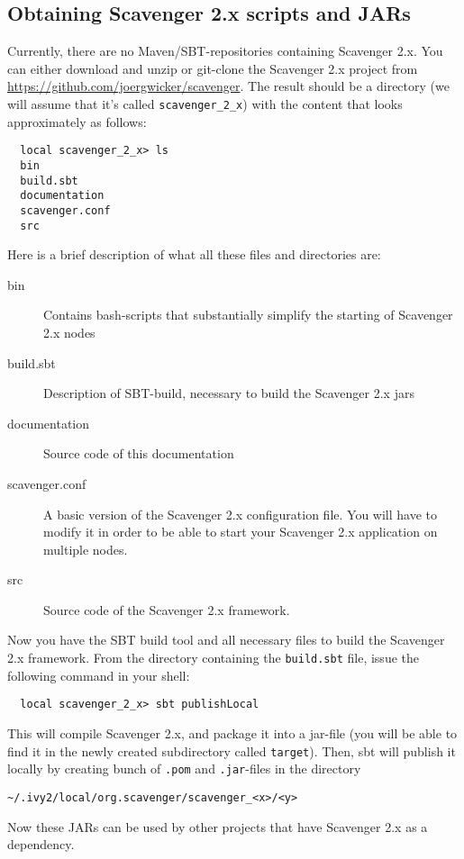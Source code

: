 \documentclass{scrbook}
\begin{document}
\subsection{Obtaining Scavenger 2.x scripts and JARs}
Currently, there are no Maven/SBT-repositories containing Scavenger 2.x.
You can either download and unzip or git-clone the Scavenger 2.x project from 
\url{https://github.com/joergwicker/scavenger}.
The result should be a directory (we will assume that it's called \lstinline{scavenger_2_x}) with the content that 
looks approximately as follows:
\begin{lstlisting}
  local scavenger_2_x> ls
  bin
  build.sbt
  documentation
  scavenger.conf
  src
\end{lstlisting}
Here is a brief description of what all these files and directories are:
\begin{description}
  \item[bin] Contains bash-scripts that substantially simplify the
    starting of Scavenger 2.x nodes
  \item[build.sbt] Description of SBT-build, necessary to build the 
    Scavenger 2.x jars
  \item[documentation] Source code of this documentation
  \item[scavenger.conf] A basic version of the Scavenger 2.x configuration
    file. You will have to modify it in order to be able to start your
    Scavenger 2.x application on multiple nodes.
  \item[src] Source code of the Scavenger 2.x framework.
\end{description}

Now you have the SBT build tool and all necessary files to build 
the Scavenger 2.x framework. From the directory containing the
\lstinline{build.sbt} file, issue the following command in your shell:
\begin{lstlisting}
  local scavenger_2_x> sbt publishLocal
\end{lstlisting}
This will compile Scavenger 2.x, and package it into a jar-file 
(you will be able to find it in the newly created subdirectory
called \lstinline{target}). 
Then, sbt will publish it locally by creating bunch of \lstinline{.pom} and \lstinline{.jar}-files in the directory 
\begin{lstlisting}
~/.ivy2/local/org.scavenger/scavenger_<x>/<y>
\end{lstlisting} 
Now these JARs can be 
used by other projects that have Scavenger 2.x as a dependency.
\end{document}
